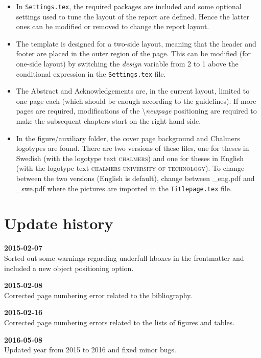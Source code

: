 \documentclass[11pt,a4paper]{article}                    			%
\numberwithin{figure}{section}                         %
\numberwithin{table}{section}                         	%
\begin{document}
\begin{itemize}
\item In \texttt{Settings.tex}, the required packages are included and some optional settings used to tune the layout of the report are defined. Hence the latter ones can be modified or removed to change the report layout.

\item The template is designed for a two-side layout, meaning that the header and footer are placed in the outer region of the page. This can be modified (for one-side layout) by switching the \emph{design} variable from 2 to 1 above the conditional expression in the \texttt{Settings.tex} file.

\item The Abstract and Acknowledgements are, in the current layout, limited to one page each (which should be enough according to the guidelines). If more pages are required, modifications of the \textbackslash\emph{newpage} positioning are required to make the subsequent chapters start on the right hand side.

\item In the figure/auxiliary folder, the cover page background and Chalmers logotypes are found. There are two versions of these files, one for theses in Swedish (with the logotype text \textsc{chalmers}) and one for theses in English (with the logotype text \textsc{chalmers university of technology}). To change between the two versions (English is default), change between \_eng.pdf and \_swe.pdf where the pictures are imported in the \texttt{Titlepage.tex} file.

\end{itemize}

\newpage
\section{Update history}
\textbf{2015-02-07}\\
Sorted out some warnings regarding underfull hboxes in the frontmatter and included a new object positioning option.

\textbf{2015-02-08}\\
Corrected page numbering error related to the bibliography.

\textbf{2015-02-16}\\
Corrected page numbering errors related to the lists of figures and tables.

\textbf{2016-05-08} \\
Updated year from 2015 to 2016 and fixed minor bugs.
\end{document}

